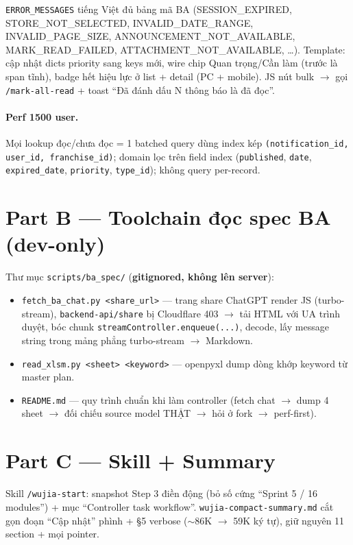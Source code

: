 \texttt{ERROR\_MESSAGES} tiếng Việt đủ bảng mã BA (SESSION\_EXPIRED, STORE\_NOT\_SELECTED,
INVALID\_DATE\_RANGE, INVALID\_PAGE\_SIZE, ANNOUNCEMENT\_NOT\_AVAILABLE, MARK\_READ\_FAILED,
ATTACHMENT\_NOT\_AVAILABLE, \ldots). Template: cập nhật dicts priority sang keys mới, wire chip
Quan trọng/Cần làm (trước là span tĩnh), badge hết hiệu lực ở list + detail (PC + mobile). JS nút
bulk $\rightarrow$ gọi \texttt{/mark-all-read} + toast ``Đã đánh dấu N thông báo là đã đọc''.

\paragraph{Perf 1500 user.} Mọi lookup đọc/chưa đọc = 1 batched query dùng index kép
\texttt{(notification\_id, user\_id, franchise\_id)}; domain lọc trên field index
(\texttt{published}, \texttt{date}, \texttt{expired\_date}, \texttt{priority}, \texttt{type\_id});
không query per-record.

\section{Part B --- Toolchain đọc spec BA (dev-only)}

Thư mục \texttt{scripts/ba\_spec/} (\textbf{gitignored, không lên server}):

\begin{itemize}
\item \texttt{fetch\_ba\_chat.py <share\_url>} --- trang share ChatGPT render JS (turbo-stream),
      \texttt{backend-api/share} bị Cloudflare 403 $\rightarrow$ tải HTML với UA trình duyệt, bóc
      chunk \texttt{streamController.enqueue(...)}, decode, lấy message string trong mảng phẳng
      turbo-stream $\rightarrow$ Markdown.
\item \texttt{read\_xlsm.py <sheet> <keyword>} --- openpyxl dump dòng khớp keyword từ master plan.
\item \texttt{README.md} --- quy trình chuẩn khi làm controller (fetch chat $\rightarrow$ dump 4 sheet
      $\rightarrow$ đối chiếu source model THẬT $\rightarrow$ hỏi ở fork $\rightarrow$ perf-first).
\end{itemize}

\section{Part C --- Skill + Summary}

Skill \texttt{/wujia-start}: snapshot Step 3 điền động (bỏ số cứng ``Sprint 5 / 16 modules'') +
mục ``Controller task workflow''. \texttt{wujia-compact-summary.md} cắt gọn đoạn ``Cập nhật'' phình
+ §5 verbose ($\sim$86K $\rightarrow$ 59K ký tự), giữ nguyên 11 section + mọi pointer.

